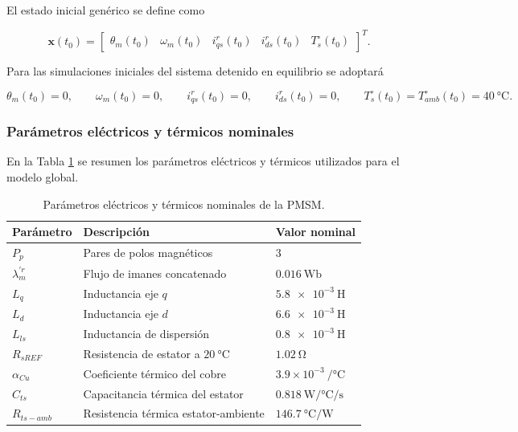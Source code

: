 \documentclass[10pt,a4paper]{article}
\begin{document}
El estado inicial genérico se define como

\begin{equation}
    \mathbf{x}(t_0)=
    \begin{bmatrix}
        \theta_m(t_0) & \omega_m(t_0) & i_{qs}^{r}(t_0) & i_{ds}^{r}(t_0) & T_s^{\circ}(t_0)
    \end{bmatrix}^{T}.
    \label{eq:estado_inicial_generico}
\end{equation}

Para las simulaciones iniciales del sistema detenido en equilibrio se adoptará

\begin{equation}
    \theta_m(t_0)=0,
    \qquad
    \omega_m(t_0)=0,
    \qquad
    i_{qs}^{r}(t_0)=0,
    \qquad
    i_{ds}^{r}(t_0)=0,
    \qquad
    T_s^{\circ}(t_0)=T_{amb}^{\circ}(t_0)=\SI{40}{\celsius}.
    \label{eq:estado_inicial_equilibrio}
\end{equation}

\subsubsection{Parámetros eléctricos y térmicos nominales}

En la Tabla \ref{tab:parametros_electricos_termicos} se resumen los parámetros eléctricos y térmicos utilizados para el modelo global.

\begin{table}[H]
    \centering
    \caption{Parámetros eléctricos y térmicos nominales de la PMSM.}
    \label{tab:parametros_electricos_termicos}
    \begin{tabular}{lll}
        \toprule
        Parámetro & Descripción & Valor nominal \\
        \midrule
        \(P_p\) & Pares de polos magnéticos & \(3\) \\
        \(\lambda_m^{\prime r}\) & Flujo de imanes concatenado & \(\SI{0.016}{\weber}\) \\
        \(L_q\) & Inductancia eje \(q\) & \(\SI{5.8e-3}{\henry}\) \\
        \(L_d\) & Inductancia eje \(d\) & \(\SI{6.6e-3}{\henry}\) \\
        \(L_{ls}\) & Inductancia de dispersión & \(\SI{0.8e-3}{\henry}\) \\
        \(R_{sREF}\) & Resistencia de estator a \(\SI{20}{\celsius}\) & \(\SI{1.02}{\ohm}\) \\
        \(\alpha_{Cu}\) & Coeficiente térmico del cobre & \(3.9\times10^{-3}\ \si{\per\celsius}\) \\
        \(C_{ts}\) & Capacitancia térmica del estator & \(\SI{0.818}{\watt\per\celsius\per\second}\) \\
        \(R_{ts-amb}\) & Resistencia térmica estator-ambiente & \(\SI{146.7}{\celsius\per\watt}\) \\
        \bottomrule
    \end{tabular}
\end{table}
\end{document}
